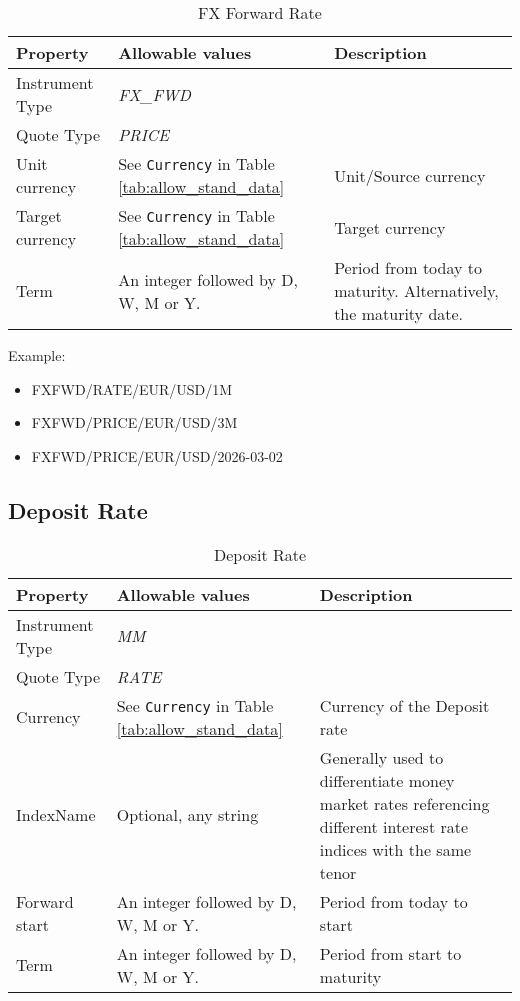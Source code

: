 \begin{table}[H]
\centering
  \begin{tabular}{|p{3.5cm}|p{3.5cm}|p{6.5cm}|}
  \hline
    {\bf Property} & {\bf Allowable values} & {\bf Description}\\ \hline
    Instrument Type & \emph{FX\_FWD} & \\ \hline
    Quote Type & \emph{PRICE} & \\ \hline
    Unit currency & See \lstinline!Currency! in Table \ref{tab:allow_stand_data} & Unit/Source currency\\ \hline
    Target currency & See \lstinline!Currency! in Table   \ref{tab:allow_stand_data} & Target currency\\  \hline
    Term & An integer followed by D, W, M or Y. & Period from today to  maturity. Alternatively, the maturity date.\\ \hline
  \end{tabular}
  \caption{FX Forward Rate}
  \label{tab:fxfwd_outright}
\end{table}

Example:
\begin{itemize}
\item {FXFWD/RATE/EUR/USD/1M}
\item{FXFWD/PRICE/EUR/USD/3M}
\item{FXFWD/PRICE/EUR/USD/2026-03-02}
\end{itemize}

\subsection{Deposit Rate}

\begin{table}[H]
\centering
  \begin{tabular}{|p{3cm}|p{3.5cm}|p{7cm}|}
  \hline
    {\bf Property} & {\bf Allowable values} & {\bf Description} \\ \hline
    Instrument Type & \emph{MM} & \\ \hline
    Quote Type & \emph{RATE} & \\ \hline
    Currency & See \lstinline!Currency! in Table \ref{tab:allow_stand_data} & Currency of the Deposit rate\\ \hline
    IndexName & Optional, any string & Generally used to differentiate money market rates referencing different interest rate indices with the same tenor\\ \hline
    Forward start & An integer followed by D, W, M or Y.  & Period from today to start \\ \hline
    Term & An integer followed by D, W, M or Y. & Period from start to maturity\\ \hline
  \end{tabular}
  \caption{Deposit Rate}
  \label{tab:deposit_quote}
\end{table}


